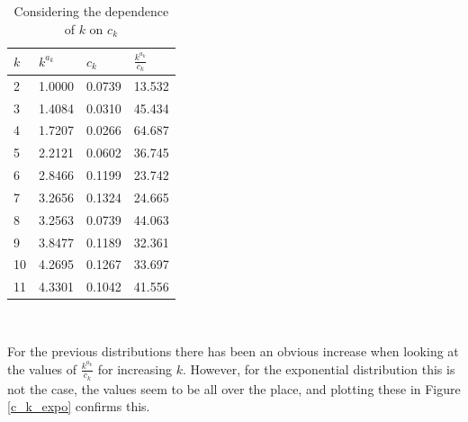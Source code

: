 \documentclass[12pt]{report}
\begin{document}
\begin{table}
\caption{Considering the dependence of $k$ on $c_{k}$} \label{expo_dependentk}
\begin{center}
\begin{tabular}{| l | l l l |} 
\toprule
$k$ &  $k^{a_{k}}$ & $c_{k}$ & $\frac{k^{a_{k}}}{c_{k}}$ \\
\midrule[1pt]
2     & 1.0000    & 0.0739    &    13.532   \\
3     & 1.4084    & 0.0310    &    45.434   \\
4     & 1.7207    & 0.0266    &    64.687   \\
5     & 2.2121    & 0.0602    &    36.745   \\
6     & 2.8466    & 0.1199    &    23.742   \\
7     & 3.2656    & 0.1324    &    24.665   \\
8     & 3.2563    & 0.0739    &    44.063   \\
9     & 3.8477    & 0.1189    &    32.361   \\
10    & 4.2695    & 0.1267    &    33.697   \\
11    & 4.3301    & 0.1042    &    41.556   \\
\hline
\end{tabular}
\\[10pt]
\end{center}
\end{table}

For the previous distributions there has been an obvious increase when looking at the values of $\frac{k^{a_{k}}}{c_{k}}$ for increasing $k$. However, for the exponential distribution this is not the case, the values seem to be all over the place, and plotting these in Figure \ref{c_k_expo} confirms this. 
\end{document}
